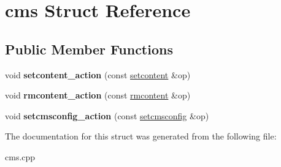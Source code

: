 \hypertarget{structcms}{}\section{cms Struct Reference}
\label{structcms}
\subsection*{Public Member Functions}
\begin{DoxyCompactItemize}
\item 
\mbox{\label{structcms_a120c8187cacad660ef2b06231f4b2474}} 
void {\bfseries setcontent\+\_\+action} (const \mbox{\hyperlink{structeosio_1_1setcontent}{setcontent}} \&op)
\item 
\mbox{\label{structcms_a01ddaec1508b8585e499d2b75b444e8c}} 
void {\bfseries rmcontent\+\_\+action} (const \mbox{\hyperlink{structeosio_1_1rmcontent}{rmcontent}} \&op)
\item 
\mbox{\label{structcms_abd37ca90dc1e747f42b42947d662b988}} 
void {\bfseries setcmsconfig\+\_\+action} (const \mbox{\hyperlink{structeosio_1_1setcmsconfig}{setcmsconfig}} \&op)
\end{DoxyCompactItemize}


The documentation for this struct was generated from the following file\+:\begin{DoxyCompactItemize}
\item 
cms.\+cpp\end{DoxyCompactItemize}
